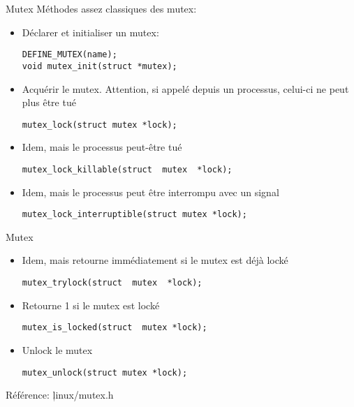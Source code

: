 \begin{frame}[fragile=singleslide]{Mutex}
  Méthodes assez classiques des mutex:
  \begin{itemize}
  \item Déclarer et initialiser un mutex:
    \begin{lstlisting} 
DEFINE_MUTEX(name);
void mutex_init(struct *mutex);
    \end{lstlisting} 
  \item Acquérir le mutex.   Attention, si appelé depuis un processus,
    celui-ci ne peut plus être tué
    \begin{lstlisting} 
mutex_lock(struct mutex *lock);
    \end{lstlisting} 
  \item Idem, mais le processus peut-être tué
    \begin{lstlisting} 
mutex_lock_killable(struct  mutex  *lock);
    \end{lstlisting} 
  \item Idem, mais le processus peut être interrompu avec un signal
    \begin{lstlisting} 
mutex_lock_interruptible(struct mutex *lock);
    \end{lstlisting} 
  \end{itemize}
\end{frame}

\begin{frame}[fragile=singleslide]{Mutex}
  \begin{itemize}
  \item Idem, mais retourne immédiatement si le mutex est déjà locké
    \begin{lstlisting} 
mutex_trylock(struct  mutex  *lock); 
    \end{lstlisting} 
  \item Retourne 1 si le mutex est locké
    \begin{lstlisting} 
mutex_is_locked(struct  mutex *lock);
    \end{lstlisting} 
  \item  Unlock le mutex
    \begin{lstlisting} 
mutex_unlock(struct mutex *lock);
    \end{lstlisting} 
  \end{itemize}
  Référence: \c{linux/mutex.h}
\end{frame} 

